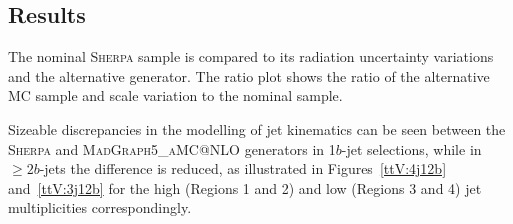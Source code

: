 



\subsection{Results}

The nominal  \textsc{Sherpa} \ttW  sample is compared to its radiation uncertainty variations and the alternative generator.
The ratio plot shows the ratio of the alternative MC sample and scale variation to the nominal sample.%

Sizeable discrepancies in the modelling of jet kinematics can be seen between the \textsc{Sherpa} \ttW and \textsc{MadGraph5\_aMC@NLO} generators in 1$b$-jet selections, while in $\geq2b$-jets the difference is reduced, as illustrated in Figures~\ref{ttV:4j12b} and~\ref{ttV:3j12b} for the high (Regions 1 and 2) and low (Regions 3 and 4) jet multiplicities correspondingly. 

